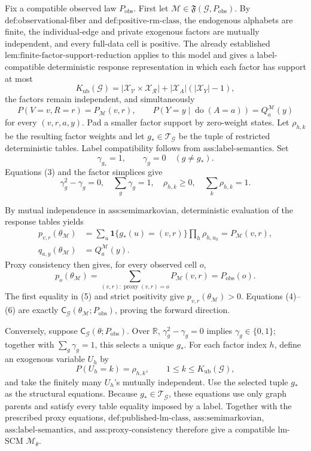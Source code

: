 Fix a compatible observed law \(P_{\mathrm{obs}}\). First let \(\mathcal M\in\mathfrak F(\mathcal G,P_{\mathrm{obs}})\). By \(\text{def:observational-fiber}\) and \(\text{def:positive-rm-class}\), the endogenous alphabets are finite, the individual-edge and private exogenous factors are mutually independent, and every full-data cell is positive. The already established \(\text{lem:finite-factor-support-reduction}\) applies to this model and gives a label-compatible deterministic response representation in which each factor has support at most
\[
K_{\mathrm{ub}}(\mathcal G)
=\left|\mathcal X_{\mathcal V}\times\mathcal X_{\mathcal R}\right|
+|\mathcal X_A|(|\mathcal X_Y|-1),
\tag{1}
\]
the factors remain independent, and simultaneously
\[
P(V=v,R=r)=P_{\mathcal M}(v,r),
\qquad
P(Y=y\mid\operatorname{do}(A=a))=Q_a^{\mathcal M}(y)
\tag{2}
\]
for every \((v,r,a,y)\). Pad a smaller factor support by zero-weight states. Let \(\rho_{h,k}\) be the resulting factor weights and let \(g_*\in\mathcal T_{\mathcal G}\) be the tuple of restricted deterministic tables. Label compatibility follows from \(\text{ass:label-semantics}\). Set
\[
\gamma_{g_*}=1,
\qquad
\gamma_g=0\quad(g\ne g_*).
\tag{3}
\]
Equations (3) and the factor simplices give
\[
\gamma_g^2-\gamma_g=0,
\quad \sum_g\gamma_g=1,
\quad \rho_{h,k}\geq0,
\quad \sum_k\rho_{h,k}=1.
\tag{4}
\]

By mutual independence in \(\text{ass:semimarkovian}\), deterministic evaluation of the response tables yields
\[
\begin{aligned}
p_{v,r}(\theta_{\mathcal M})
&=\sum_u\mathbf 1\{g_*(u)=(v,r)\}\prod_h\rho_{h,u_h}
=P_{\mathcal M}(v,r),\\
q_{a,y}(\theta_{\mathcal M})
&=Q_a^{\mathcal M}(y).
\end{aligned}
\tag{5}
\]
Proxy consistency then gives, for every observed cell \(o\),
\[
p_o(\theta_{\mathcal M})
=\sum_{(v,r):\operatorname{proxy}(v,r)=o}P_{\mathcal M}(v,r)
=P_{\mathrm{obs}}(o).
\tag{6}
\]
The first equality in (5) and strict positivity give \(p_{v,r}(\theta_{\mathcal M})>0\). Equations (4)--(6) are exactly \(\mathsf C_{\mathcal G}(\theta_{\mathcal M};P_{\mathrm{obs}})\), proving the forward direction.

Conversely, suppose \(\mathsf C_{\mathcal G}(\theta;P_{\mathrm{obs}})\). Over \(\mathbb R\), \(\gamma_g^2-\gamma_g=0\) implies \(\gamma_g\in\{0,1\}\); together with \(\sum_g\gamma_g=1\), this selects a unique \(g_*\). For each factor index \(h\), define an exogenous variable \(U_h\) by
\[
P(U_h=k)=\rho_{h,k},
\qquad 1\leq k\leq K_{\mathrm{ub}}(\mathcal G),
\tag{7}
\]
and take the finitely many \(U_h\)'s mutually independent. Use the selected tuple \(g_*\) as the structural equations. Because \(g_*\in\mathcal T_{\mathcal G}\), these equations use only graph parents and satisfy every table equality imposed by a label. Together with the prescribed proxy equations, \(\text{def:published-lm-class}\), \(\text{ass:semimarkovian}\), \(\text{ass:label-semantics}\), and \(\text{ass:proxy-consistency}\) therefore give a compatible lm-SCM \(\mathcal M_\theta\).

